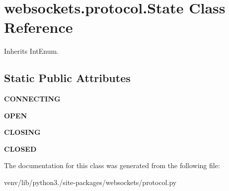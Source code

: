 \hypertarget{classwebsockets_1_1protocol_1_1_state}{}\section{websockets.\+protocol.\+State Class Reference}
\label{classwebsockets_1_1protocol_1_1_state}


Inherits Int\+Enum.

\subsection*{Static Public Attributes}
\begin{DoxyCompactItemize}
\item 
\mbox{\label{classwebsockets_1_1protocol_1_1_state_ad482c9bc1d38bd72de1b1fa4ace8516b}} 
{\bfseries C\+O\+N\+N\+E\+C\+T\+I\+NG}
\item 
\mbox{\label{classwebsockets_1_1protocol_1_1_state_a3130411fdfdb2b56c4916d8c7209ce1e}} 
{\bfseries O\+P\+EN}
\item 
\mbox{\label{classwebsockets_1_1protocol_1_1_state_a6572eb92c6a5c66abaad90937cecef3c}} 
{\bfseries C\+L\+O\+S\+I\+NG}
\item 
\mbox{\label{classwebsockets_1_1protocol_1_1_state_a0d128deef804182300b9352516ab3846}} 
{\bfseries C\+L\+O\+S\+ED}
\end{DoxyCompactItemize}


The documentation for this class was generated from the following file\+:\begin{DoxyCompactItemize}
\item 
venv/lib/python3./site-\/packages/websockets/protocol.\+py\end{DoxyCompactItemize}
